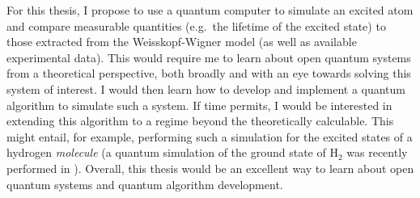 \documentclass[11pt,twoside,reqno]{amsart}
\theoremstyle{plain}
\theoremstyle{remark}
\theoremstyle{definition}
\theoremstyle{remark}
\theoremstyle{definition}
\theoremstyle{definition}
\begin{document}
For this thesis, I propose to use a quantum computer to simulate an excited atom and compare measurable quantities (e.g.\ the lifetime of the excited state) to those extracted from the Weisskopf-Wigner model (as well as available experimental data). This would require me to learn about open quantum systems from a theoretical perspective, both broadly and with an eye towards solving this system of interest. I would then learn how to develop and implement a quantum algorithm to simulate such a system. If time permits, I would be interested in extending this algorithm to a regime beyond the theoretically calculable. This might entail, for example, performing such a simulation for the excited states of a hydrogen \textit{molecule} (a quantum simulation of the ground state of H$_2$ was recently performed in \cite{urbanek_error_2020-1}). Overall, this thesis would be an excellent way to learn about open quantum systems and quantum algorithm development.



\end{document}
